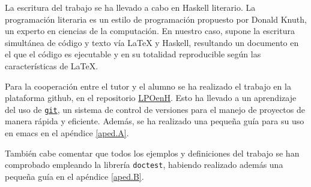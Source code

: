 La escritura del trabajo se ha llevado a cabo en Haskell literario. La programación
literaria es un estilo de programación propuesto por Donald Knuth, un experto en
ciencias de la computación. En nuestro caso, supone la escritura simultánea de código
y texto vía LaTeX y Haskell, resultando un documento en el que el código es ejecutable
y en su totalidad reproducible según las características de LaTeX. 

Para la cooperación entre el tutor y el alumno se ha realizado el trabajo en la plataforma
github, en el repositorio \href{https://github.com/EduPH/LPOenH}{LPOenH}. Esto ha
llevado a un aprendizaje del uso de \href{https://git-scm.com/}{\texttt{git}}, un sistema de control de versiones
para el manejo de proyectos de manera rápida y eficiente. Además, se ha realizado una pequeña guía para su uso en emacs en el apéndice \ref{aped.A}.

También cabe comentar que todos los ejemplos y definiciones del trabajo se han comprobado empleando la librería
\texttt{doctest}, habiendo realizado además una pequeña guía en el apéndice \ref{aped.B}.


